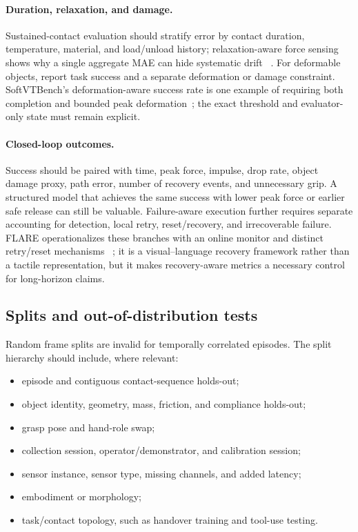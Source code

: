 \paragraph{Duration, relaxation, and damage.}
Sustained-contact evaluation should stratify error by contact duration,
temperature, material, and load/unload history; relaxation-aware force sensing
shows why a single aggregate MAE can hide systematic drift
~\cite{wang2026relaxation}. For deformable objects, report task success and a
separate deformation or damage constraint. SoftVTBench's deformation-aware
success rate is one example of requiring both completion and bounded peak
deformation~\cite{jing2026softvtbench}; the exact threshold and evaluator-only
state must remain explicit.

\paragraph{Closed-loop outcomes.}
Success should be paired with time, peak force, impulse, drop rate, object damage
proxy, path error, number of recovery events, and unnecessary grip. A structured
model that achieves the same success with lower peak force or earlier safe release
can still be valuable.
Failure-aware execution further requires separate accounting for detection,
local retry, reset/recovery, and irrecoverable failure. FLARE operationalizes
these branches with an online monitor and distinct retry/reset mechanisms
~\cite{zhao2026flare}; it is a visual--language recovery framework rather than a
tactile representation, but it makes recovery-aware metrics a necessary control
for long-horizon claims.

\subsection{Splits and out-of-distribution tests}

Random frame splits are invalid for temporally correlated episodes. The split
hierarchy should include, where relevant:

\begin{itemize}
  \item episode and contiguous contact-sequence holds-out;
  \item object identity, geometry, mass, friction, and compliance holds-out;
  \item grasp pose and hand-role swap;
  \item collection session, operator/demonstrator, and calibration session;
  \item sensor instance, sensor type, missing channels, and added latency;
  \item embodiment or morphology;
  \item task/contact topology, such as handover training and tool-use testing.
\end{itemize}

